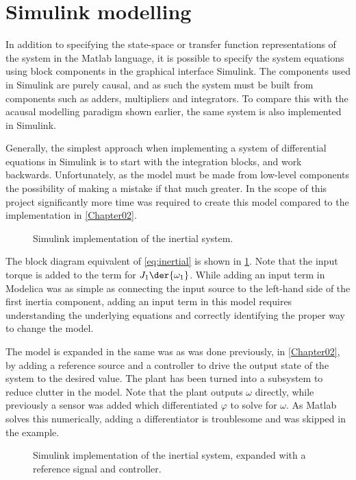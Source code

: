 \documentclass[\rootfolder/main.tex]{subfiles}
\begin{document}
\section{Simulink modelling}

In addition to specifying the state-space or transfer function representations of the system in the Matlab language, it is possible to specify
the system equations using block components in the graphical interface Simulink.
The components used in Simulink are purely causal, and as such the system must be built from components such as adders, multipliers and integrators.
To compare this with the acausal modelling paradigm shown earlier, the same system is also implemented in Simulink.

Generally, the simplest approach when implementing a system of differential equations in Simulink is to start with the integration blocks, and work backwards.
Unfortunately, as the model must be made from low-level components the possibility of making a mistake if that much greater.
In the scope of this project significantly more time was required to create this model compared to the implementation in \cref{Chapter02}.

\begin{figure}[ht]
    \caption{Simulink implementation of the inertial system.\label{fig:simulink-inertial}}
\end{figure}

The block diagram equivalent of \cref{eq:inertial} is shown in \cref{fig:simulink-inertial}.
Note that the input torque is added to the term for $J_{1} \der{\omega_{1}}$.
While adding an input term in Modelica was as simple as connecting the input source to the left-hand side of the first inertia component,
adding an input term in this model requires understanding the underlying equations and correctly identifying the proper way to change the model.

The model is expanded in the same was as was done previously, in \cref{Chapter02}, by adding a reference source and a controller to drive the output state of the system to the desired value.
The plant has been turned into a subsystem to reduce clutter in the model.
Note that the plant outputs $\omega$ directly, while previously a sensor was added which differentiated $\varphi$ to solve for $\omega$.
As Matlab solves this numerically, adding a differentiator is troublesome and was skipped in the example.

\begin{wrapfigure}{R}{0.5\columnwidth}
    \caption{Simulink implementation of the inertial system, expanded with a reference signal and controller.\label{fig:simulink-inertial-expanded}}
\end{wrapfigure}
\end{document}
